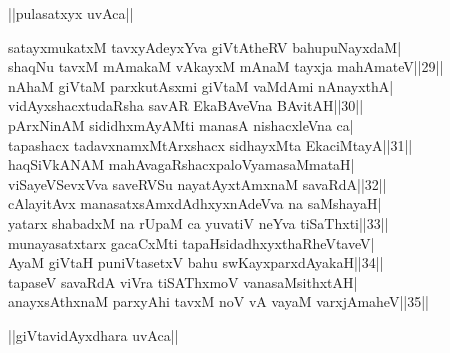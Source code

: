 \documentclass{article}
\begin{document}
\begin{center}
||pulasatxyx uvAca||
\end{center}

satayxmukatxM tavxyAdeyxYva giVtAtheRV bahupuNayxdaM|\\
shaqNu tavxM mAmakaM vAkayxM mAnaM tayxja mahAmateV||29||\\
nAhaM giVtaM parxkutAsxmi giVtaM vaMdAmi nAnayxthA|\\
vidAyxshacxtudaRsha savAR EkaBAveVna BAvitAH||30||\\
pArxNinAM sididhxmAyAMti manasA nishacxleVna ca|\\
tapashacx tadavxnamxMtArxshacx sidhayxMta EkaciMtayA||31||\\
haqSiVkANAM mahAvagaRshacxpaloVyamasaMmataH|\\
viSayeVSevxVva saveRVSu nayatAyxtAmxnaM savaRdA||32||\\
cAlayitAvx manasatxsAmxdAdhxyxnAdeVva na saMshayaH|\\
yatarx shabadxM na rUpaM ca yuvatiV neYva tiSaThxti||33||\\
munayasatxtarx gacaCxMti tapaHsidadhxyxthaRheVtaveV|\\
AyaM giVtaH puniVtasetxV bahu swKayxparxdAyakaH||34||\\
tapaseV savaRdA viVra tiSAThxmoV vanasaMsithxtAH|\\
anayxsAthxnaM parxyAhi tavxM noV vA vayaM varxjAmaheV||35||\\

\begin{center}
||giVtavidAyxdhara uvAca||
\end{center}
\end{document}
